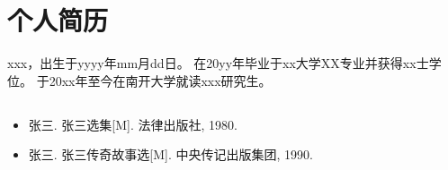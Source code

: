 \documentclass[12pt,openright]{book}
\begin{document}
\chapter*{个人简历}


xxx，出生于yyyy年mm月dd日。
在20yy年毕业于xx大学XX专业并获得xx士学位。
于20xx年至今在南开大学就读xxx研究生。


\section*{}

\begin{itemize}
	\item 张三. 张三选集[M]. 法律出版社, 1980.
	\item 张三. 张三传奇故事选[M]. 中央传记出版集团, 1990.
\end{itemize}




\end{document}
